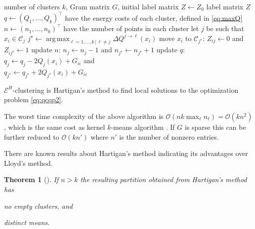 \documentclass[twoside]{article}
\newtheorem{theorem}{Theorem}
\DeclareMathOperator*{\argmax}{arg\,max}
\newcommand\C{{\mathcal{C}}}
\newcommand\OO{{\mathcal{O}}}
\begin{document}
\begin{algorithm}
\begin{algorithmic}[1]
    \INPUT number of clusters $k$, Gram matrix $G$, 
                initial label matrix $Z \leftarrow Z_0$
    \OUTPUT label matrix $Z$
  \STATE $q \leftarrow (Q_1, \dotsc, Q_k)^\top$ 
            have the energy costs of each cluster, defined in \eqref{eq:maxQ}
  \STATE $n \leftarrow (n_1,\dotsc,n_k)^\top$ have the number of points 
        in each cluster%
  \REPEAT
        \STATE let $j$ be such that $x_i \in \C_j$
        \STATE $j^\star \leftarrow \argmax_{\ell=1,\dotsc,k \, | \, \ell\ne j} 
                \Delta Q^{j\to \ell}(x_i)$
            \STATE move $x_i$ to $\C_{j^\star}$: $Z_{ij} \leftarrow 0$ and 
            $Z_{ij^\star} \leftarrow 1$
            \STATE update $n$: $n_j \leftarrow n_j - 1$ and
                    $n_{j^\star} \leftarrow n_{j^\star} + 1$
            \STATE update $q$: $q_j \leftarrow q_j - 2Q_j(x_i) + G_{ii}$ and \\
             \hspace{4.5em}$q_{j^\star} \leftarrow q_{j^\star} + 
                            2Q_{j^\star}(x_i)+ G_{ii}$
        \ENDIF
    \ENDFOR
\end{algorithmic}
\caption{\label{algo}
$\mathcal{E}^H$-clustering is Hartigan's method to find local solutions 
to the optimization problem \eqref{eq:qcqp2}.
}
\end{algorithm}

The worst time complexity of the above algorithm is
$\OO(n k  \max_\ell n_\ell) =\OO(k n^2)$, which
is the same cost as kernel $k$-means algorithm
\citep{Dhillon2,Dhillon}. 
If $G$ is sparse
this can be further reduced to $\OO(k n')$ where $n'$ is the number of 
nonzero entries.

There are known results about Hartigan's method
indicating its advantages over Lloyd's method.

\begin{theorem}[\cite{Telgarsky}]
If $n > k$ the resulting partition obtained from Hartigan's method has 
\begin{enumerate*}
\item \label{noempty} no empty clusters, and
\item \label{diffmean} distinct means.
\end{enumerate*}
\end{theorem}
\end{document}
